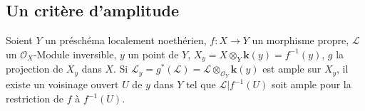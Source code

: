 
\subsection{Un critère d'amplitude}

\begin{theorem}[4.7.1]
\label{III.4.7.1-fr}
Soient $Y$ un préschéma localement noethérien, $f:X\to Y$ un morphisme
propre, $\mathcal L$ un $\mathcal O_X$-Module inversible, $y$ un point de
$Y$, $X_y=X\otimes_Y\boldsymbol{k}(y)=f^{-1}(y)$, $g$ la projection de $X_y$ dans $X$.
Si $\mathcal L_y=g^*(\mathcal L)=\mathcal L\otimes_{\mathcal O_Y}\boldsymbol{k}(y)$ est
ample sur $X_y$, il existe un voisinage ouvert $U$ de $y$ dans $Y$ tel que
$\mathcal L|f^{-1}(U)$ soit ample pour la restriction de $f$ à $f^{-1}(U)$.
\end{theorem}

